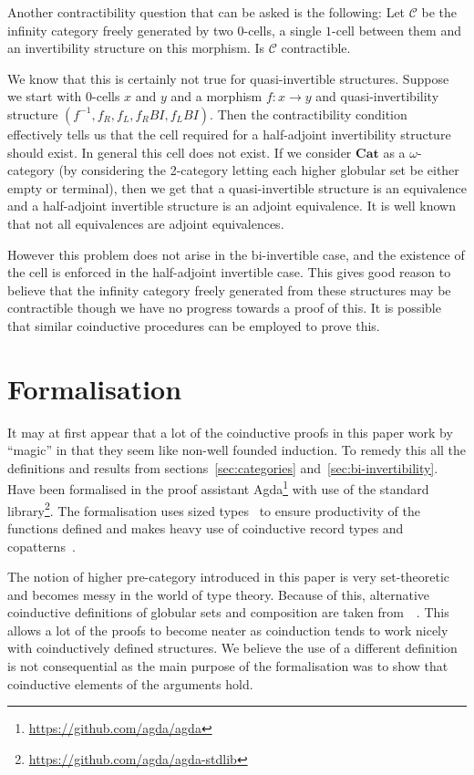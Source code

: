 \documentclass{article}
\theoremstyle{definition}
\theoremstyle{remark}
\newcommand{\inv}[1]{#1^{-1}}
\begin{document}
Another contractibility question that can be asked is the following: Let \(\mathcal{C}\) be the infinity category freely generated by two \(0\)-cells, a single \(1\)-cell between them and an invertibility structure on this morphism. Is \(\mathcal{C}\) contractible.

We know that this is certainly not true for quasi-invertible structures. Suppose we start with \(0\)-cells \(x\) and \(y\) and a morphism \(f : x \to y\) and quasi-invertibility structure \((\inv f, f_R, f_L, f_R{}BI, f_L{}BI)\). Then the contractibility condition effectively tells us that the cell required for a half-adjoint invertibility structure should exist. In general this cell does not exist. If we consider \(\mathbf{Cat}\) as a \(\omega\)-category (by considering the 2-category letting each higher globular set be either empty or terminal), then we get that a quasi-invertible structure is an equivalence and a half-adjoint invertible structure is an adjoint equivalence. It is well known that not all equivalences are adjoint equivalences.

However this problem does not arise in the bi-invertible case, and the existence of the cell is enforced in the half-adjoint invertible case. This gives good reason to believe that the infinity category freely generated from these structures may be contractible though we have no progress towards a proof of this. It is possible that similar coinductive procedures can be employed to prove this.

\section{Formalisation}\label{sec:formalisation}

It may at first appear that a lot of the coinductive proofs in this paper work by ``magic'' in that they seem like non-well founded induction. To remedy this all the definitions and results from  sections~\ref{sec:categories} and~\ref{sec:bi-invertibility}. Have been formalised in the proof assistant Agda\footnote{\url{https://github.com/agda/agda}} with use of the standard library\footnote{\url{https://github.com/agda/agda-stdlib}}. The formalisation uses sized types~\cite{Abel_2010} to ensure productivity of the functions defined and makes heavy use of coinductive record types and copatterns~\cite{10.1145/2480359.2429075}.

The notion of higher pre-category introduced in this paper is very set-theoretic and becomes messy in the world of type theory. Because of this, alternative coinductive definitions of globular sets and composition are taken from~~\cite{hirschowitz_et_al:LIPIcs:2015:5166}. This allows a lot of the proofs to become neater as coinduction tends to work nicely with coinductively defined structures. We believe the use of a different definition is not consequential as the main purpose of the formalisation was to show that coinductive elements of the arguments hold.
\end{document}
